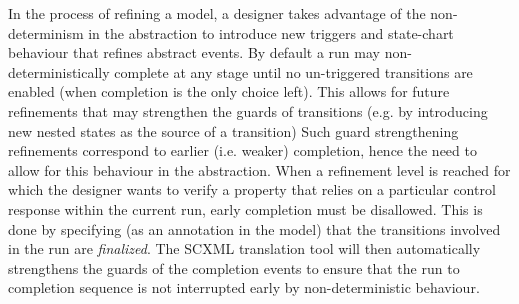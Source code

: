 In the process of refining a model, a designer takes advantage of the non-determinism in the abstraction to introduce new triggers and 
state-chart behaviour that refines abstract events.
By default a run may non-deterministically complete at any stage until no un-triggered transitions are enabled (when completion is the only choice left).
This allows for future refinements that may strengthen the guards of transitions (e.g. by introducing new nested states as the source of a transition)
Such guard strengthening refinements correspond to earlier (i.e. weaker) completion, hence the need to allow for this behaviour in the abstraction.
When a refinement level is reached for which the designer wants to verify a property that relies on a particular control response within the current run, 
early completion must be disallowed.
This is done by specifying (as an annotation in the \SCXML model) that the transitions involved in the run are \emph{finalized}. 
The SCXML translation tool will then automatically strengthens the guards of the completion events 
 to ensure that the run to completion sequence is not interrupted early by non-deterministic behaviour.  




